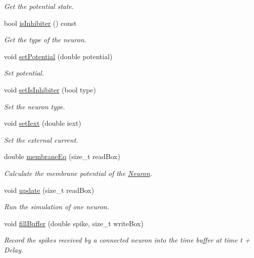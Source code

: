 \begin{DoxyCompactItemize}
\begin{DoxyCompactList}\small\item\em Get the potential state. \end{DoxyCompactList}\item 
bool \hyperlink{classNeuron_a405d790f14e9bd3fea033dc84ae4b53f}{is\-Inhibiter} () const 
\begin{DoxyCompactList}\small\item\em Get the type of the neuron. \end{DoxyCompactList}\item 
void \hyperlink{classNeuron_aeb0bb5498270ef19067e9f3c0da07504}{set\-Potential} (double potential)
\begin{DoxyCompactList}\small\item\em Set potential. \end{DoxyCompactList}\item 
void \hyperlink{classNeuron_afeb99227718974907e783f56cd5ec333}{set\-Is\-Inhibiter} (bool type)
\begin{DoxyCompactList}\small\item\em Set the neuron type. \end{DoxyCompactList}\item 
void \hyperlink{classNeuron_a32aa33ce0a7604fc1f5989a0311a8106}{set\-Iext} (double iext)
\begin{DoxyCompactList}\small\item\em Set the external current. \end{DoxyCompactList}\item 
double \hyperlink{classNeuron_a8d9657df147998e311e34e535f64cba6}{membrane\-Eq} (size\-\_\-t read\-Box)
\begin{DoxyCompactList}\small\item\em Calculate the membrane potential of the \hyperlink{classNeuron}{Neuron}. \end{DoxyCompactList}\item 
void \hyperlink{classNeuron_a8b6ba307a2a97129356ce6f704349eb8}{update} (size\-\_\-t read\-Box)
\begin{DoxyCompactList}\small\item\em Run the simulation of one neuron. \end{DoxyCompactList}\item 
void \hyperlink{classNeuron_acb7b16b04ed3a5529319c2cb984f5840}{fill\-Buffer} (double spike, size\-\_\-t write\-Box)
\begin{DoxyCompactList}\small\item\em Record the spikes received by a connected neuron into the time buffer at time t + Delay. \end{DoxyCompactList}\end{DoxyCompactItemize}
